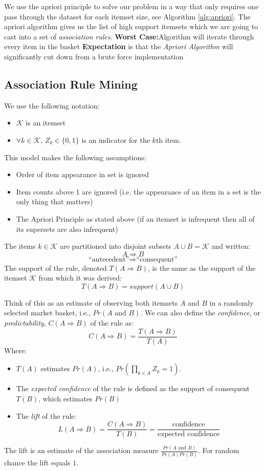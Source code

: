\documentclass[a4paper]{article}
\begin{document}
We use the apriori principle to solve our problem in a way that only requires one pass through the dataset for each itemset size, see Algorithm \ref{alg:apriori}.  The apriori algorithm gives us the list of high support itemsets which we are going to cast into a set of \textit{association rules}. 
\textbf{Worst Case:}Algorithm will iterate through every item in the basket \textbf{Expectation} is that the \textit{Apriori Algorithm} will significantly cut down from a brute force implementation

\subsection{Association Rule Mining}
We use the following notation:
\begin{itemize}
\item $\mathcal{K}$ is an itemset
\item $\forall k\in\mathcal{K}$, $Z_k\in \{0,1\}$ is an indicator for the $k$th item.
\end{itemize}

This model makes the following assumptions:
\begin{itemize}
\item Order of item appearance in set is ignored
\item Item counts above 1 are ignored (i.e. the appearance of an item in a set is the only thing that matters)
\item The Apriori Principle as stated above (if an itemset is infrequent then all of its supersets are also infrequent)
\end{itemize}

The items $k\in\mathcal{K}$ are partitioned into disjoint subsets $A\cup B=\mathcal{K}$ and written:
$$A\Rightarrow B$$
$$\text{``antecedent''}\Rightarrow \text{``consequent''}$$
The support of the rule, denoted $T(A\Rightarrow B)$, is the same as the support of the itemset $\mathcal{K}$ from which it was derived:
$$T(A\Rightarrow B)=support(A\cup B)$$

Think of this as an estimate of observing both itemsets $A$ and $B$ in a randomly selected market basket, i.e., $Pr(A \text{\ and\ } B)$.  We can also define the \textit{confidence}, or \textit{predictability}, $C(A\Rightarrow B)$ of the rule as:
$$C(A\Rightarrow B)=\frac{T(A\Rightarrow B)}{T(A)}$$
Where: 
\begin{itemize}
\item $T(A)$ estimates $Pr(A)$, i.e., $Pr(\prod_{k\in A}Z_k=1)$.
\item The \textit{expected confidence} of the rule is defined as the support of consequent $T(B)$, which estimates $Pr(B)$
\item The \textit{lift} of the rule:
$$L(A\Rightarrow B)=\frac{C(A\Rightarrow B)}{T(B)}=\frac{\text{confidence}}{\text{expected confidence}}$$
\end{itemize}
The lift is an estimate of the association measure $\frac{Pr(A \text{\ and\ } B)}{Pr(A)Pr(B)}$. For random chance the lift equals $1$.\\
\end{document}
